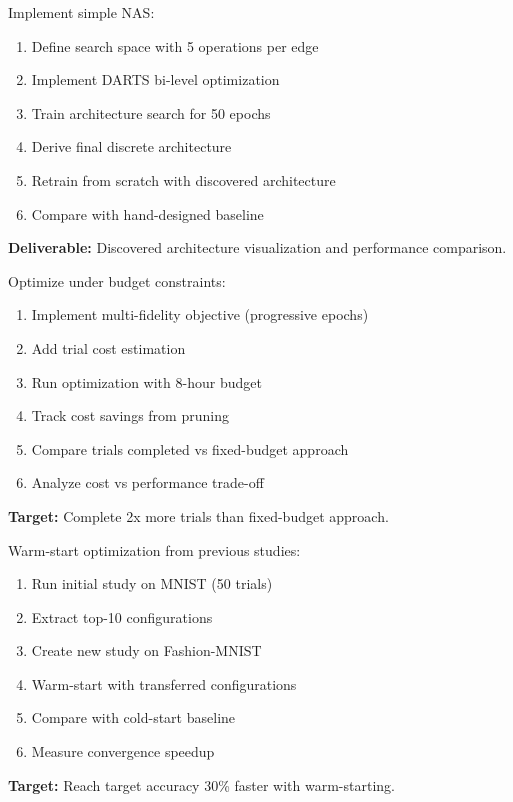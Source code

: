 \begin{exercise}
Implement simple NAS:
\begin{enumerate}
    \item Define search space with 5 operations per edge
    \item Implement DARTS bi-level optimization
    \item Train architecture search for 50 epochs
    \item Derive final discrete architecture
    \item Retrain from scratch with discovered architecture
    \item Compare with hand-designed baseline
\end{enumerate}
\textbf{Deliverable:} Discovered architecture visualization and performance comparison.
\end{exercise}

\begin{exercise}
Optimize under budget constraints:
\begin{enumerate}
    \item Implement multi-fidelity objective (progressive epochs)
    \item Add trial cost estimation
    \item Run optimization with 8-hour budget
    \item Track cost savings from pruning
    \item Compare trials completed vs fixed-budget approach
    \item Analyze cost vs performance trade-off
\end{enumerate}
\textbf{Target:} Complete 2x more trials than fixed-budget approach.
\end{exercise}

\begin{exercise}
Warm-start optimization from previous studies:
\begin{enumerate}
    \item Run initial study on MNIST (50 trials)
    \item Extract top-10 configurations
    \item Create new study on Fashion-MNIST
    \item Warm-start with transferred configurations
    \item Compare with cold-start baseline
    \item Measure convergence speedup
\end{enumerate}
\textbf{Target:} Reach target accuracy 30\% faster with warm-starting.
\end{exercise}

